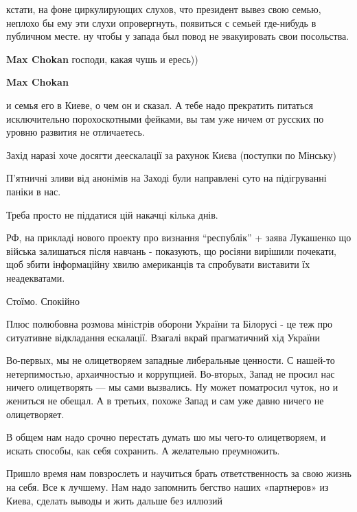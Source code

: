 \begin{itemize}
кстати, на фоне циркулирующих слухов, что президент вывез свою семью, неплохо
бы ему эти слухи опровергнуть, появиться с семьей где-нибудь в публичном месте.
ну чтобы у запада был повод не эвакуировать свои посольства.

\begin{itemize} %
\textbf{Max Chokan} господи, какая чушь и ересь))

\textbf{Max Chokan} 

и семья его в Киеве, о чем он и сказал. А тебе надо прекратить питаться
исключительно порохоскотными фейками, вы там уже ничем от русских по уровню
развития не отличаетесь.

\end{itemize} %


Захід наразі хоче досягти деескалації за рахунок Києва (поступки по Мінську)

П'ятничні зливи від анонімів на Заході були направлені суто на підігруванні
паніки в нас.

Треба просто не піддатися цій накачці кілька днів.

РФ, на прикладі нового проекту про визнання \enquote{республік} + заява Лукашенко що
війська залишаться після навчань - показують, що росіяни вирішили почекати, щоб
збити інформаційну хвилю американців та спробувати виставити їх неадекватами.

Стоїмо. Спокійно


Плюс полюбовна розмова міністрів оборони України та Білорусі - це теж про
ситуативне відкладання ескалації. Взагалі вкрай прагматичний хід України


Во-первых, мы не олицетворяем западные либеральные ценности. С нашей-то
нетерпимостью, архаичностью и коррупцией. Во-вторых, Запад не просил нас ничего
олицетворять — мы сами вызвались. Ну может поматросил чуток, но и жениться не
обещал. А в третьих, похоже Запад и сам уже давно ничего не олицетворяет.

В общем нам надо срочно перестать думать шо мы чего-то олицетворяем, и искать
способы, как себя сохранить. А желательно преумножить.


Пришло время нам повзрослеть и научиться брать ответственность за свою жизнь на
себя. Все к лучшему. Нам надо запомнить бегство наших «партнеров» из Киева,
сделать выводы и жить дальше без иллюзий


\end{itemize}
